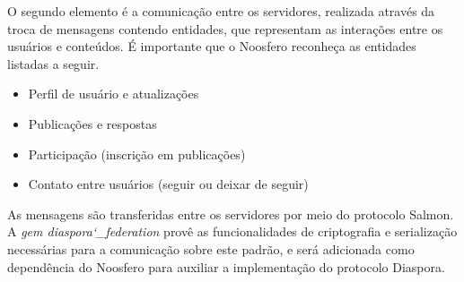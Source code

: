 O segundo elemento é a comunicação entre os servidores, realizada através da troca
de mensagens contendo entidades, que representam as interações entre os usuários e
conteúdos. É importante que o Noosfero reconheça as entidades listadas a seguir.

\begin{itemize}
  \item{Perfil de usuário e atualizações}
  \item{Publicações e respostas}
  \item{Participação (inscrição em publicações)}
  \item{Contato entre usuários (seguir ou deixar de seguir)}
\end{itemize}

As mensagens são transferidas entre os servidores por meio do protocolo Salmon. A
\textit{gem diaspora\char`_federation} provê as funcionalidades de criptografia e
serialização necessárias para a comunicação sobre este padrão, e será adicionada
como dependência do Noosfero para auxiliar a implementação do protocolo Diaspora.

